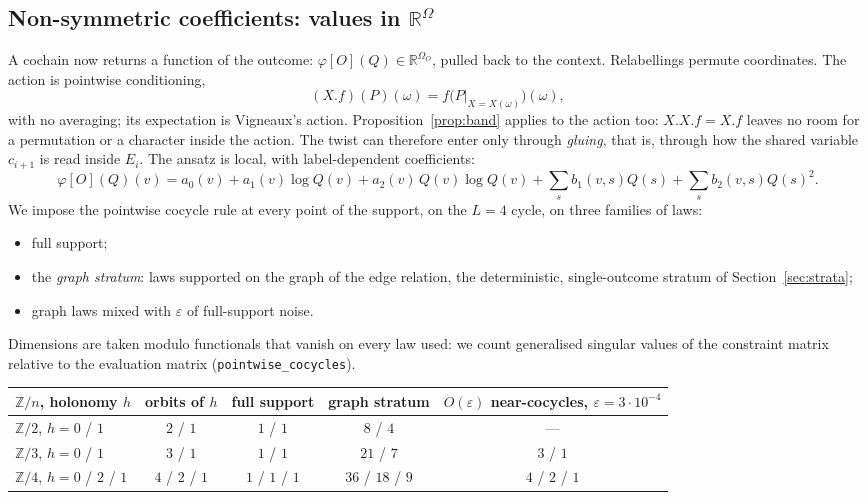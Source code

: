 \documentclass[11pt]{article}
\theoremstyle{definition}
\theoremstyle{remark}
\newcommand{\Z}{\mathbb{Z}}
\newcommand{\R}{\mathbb{R}}
\begin{document}
\subsection*{Non-symmetric coefficients: values in $\R^{\Omega}$}
A cochain now returns a function of the outcome: $\varphi[O](Q)\in\R^{\Omega_O}$, pulled back to the context. Relabellings permute coordinates. The action is pointwise conditioning,
\[
(X.f)(P)(\omega)=f\bigl(P|_{X=X(\omega)}\bigr)(\omega),
\]
with no averaging; its expectation is Vigneaux's action. Proposition~\ref{prop:band} applies to the action too: $X.X.f=X.f$ leaves no room for a permutation or a character inside the action. The twist can therefore enter only through \emph{gluing}, that is, through how the shared variable $c_{i+1}$ is read inside $E_i$. The ansatz is local, with label-dependent coefficients:
\[
\varphi[O](Q)(v)=a_0(v)+a_1(v)\log Q(v)+a_2(v)\,Q(v)\log Q(v)+\textstyle\sum_s b_1(v,s)Q(s)+\sum_s b_2(v,s)Q(s)^2 .
\]
We impose the pointwise cocycle rule at every point of the support, on the $L=4$ cycle, on three families of laws:
\begin{itemize}
  \item full support;
  \item the \emph{graph stratum}: laws supported on the graph of the edge relation, the deterministic, single-outcome stratum of Section~\ref{sec:strata};
  \item graph laws mixed with $\varepsilon$ of full-support noise.
\end{itemize}
Dimensions are taken modulo functionals that vanish on every law used: we count generalised singular values of the constraint matrix relative to the evaluation matrix (\texttt{pointwise\_cocycles}).

\begin{center}\small
\begin{tabular}{lcccc}
\hline
$\Z/n$, holonomy $h$ & orbits of $h$ & full support & graph stratum & $O(\varepsilon)$ near-cocycles, $\varepsilon=3\cdot10^{-4}$\\
\hline
$\Z/2$, $h=0$ / $1$ & $2$ / $1$ & $1$ / $1$ & $8$ / $4$ & ---\\
$\Z/3$, $h=0$ / $1$ & $3$ / $1$ & $1$ / $1$ & $21$ / $7$ & $3$ / $1$\\
$\Z/4$, $h=0$ / $2$ / $1$ & $4$ / $2$ / $1$ & $1$ / $1$ / $1$ & $36$ / $18$ / $9$ & $4$ / $2$ / $1$\\
\hline
\end{tabular}
\end{center}
\end{document}
